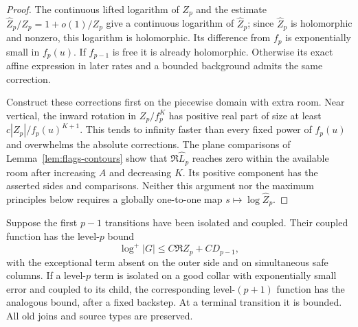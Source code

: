 \begin{proof}
The continuous lifted logarithm of $Z_p$ and the estimate
$\widehat Z_p/Z_p=1+o(1)/Z_p$ give a continuous logarithm of
$\widehat Z_p$; since $\widehat Z_p$ is holomorphic and nonzero,
this logarithm is holomorphic.  Its difference from $f_p$ is
exponentially small in $f_p(u)$.  If $f_{p-1}$ is free it is
already holomorphic.  Otherwise its exact affine expression in
later rates and a bounded background admits the same correction.

Construct these corrections first on the piecewise domain with
extra room.  Near vertical, the inward rotation in $Z_p/f_p^K$
has positive real part of size at least
$c|Z_p|/f_p(u)^{K+1}$.  This tends to infinity faster than every
fixed power of $f_p(u)$ and overwhelms the absolute corrections.
The plane comparisons of Lemma~\ref{lem:flags-contours} show that
$\Re\widehat L_p$ reaches zero within the available room after
increasing $A$ and decreasing $K$.  Its positive component has
the asserted sides and comparisons.  Neither this argument nor
the maximum principles below requires a globally one-to-one
map $s\mapsto\log\widehat Z_p$.
\end{proof}

\begin{lemma}
\label{lem:separation-growth}
Suppose the first $p-1$ transitions have been isolated and coupled.
Their coupled function has the level-$p$ bound
\begin{equation}\label{eq:separation-coupled-growth}
 \log^+|G|\leq C\Re Z_p+CD_{p-1},
\end{equation}
with the exceptional term absent on the outer side and on
simultaneous safe columns.  If a level-$p$ term is isolated on a
good collar with exponentially small error and coupled to its
child, the corresponding level-$(p+1)$ function has the analogous
bound, after a fixed backstep.  At a terminal transition it is
bounded.  All old joins and source types are preserved.
\end{lemma}


